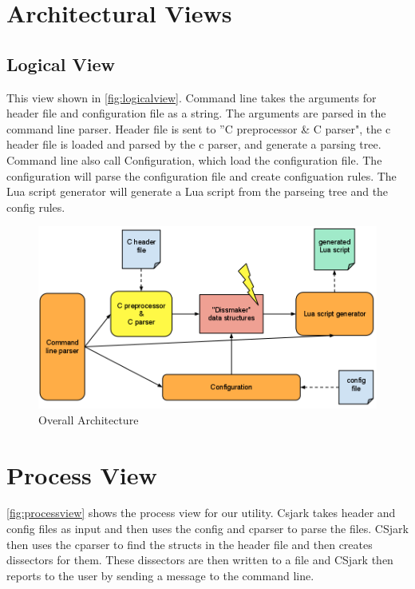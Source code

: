 \section{Architectural Views}

\subsection{Logical View}
This view shown in \autoref{fig:logicalview}. Command line takes the arguments for header file and configuration file as a string. The arguments are parsed in the command line parser. Header file is sent to ''C preprocessor \& C parser", the c header file is loaded and parsed by the c parser, and generate a parsing tree. Command line also call Configuration, which load the configuration file. The configuration will parse the configuration file and create configuation rules. The Lua script generator will generate a Lua script from the parseing tree and the config rules.

\begin{figure}[ht]
\includegraphics[width=\textwidth]{./planning/img/overall_design.png}
\caption{Overall Architecture}
\label{fig:logicalview}
\end{figure}

\section{Process View}
\autoref{fig:processview} shows the process view for our utility. Csjark takes header and config files as input and then uses the config and cparser to parse the files. CSjark then uses the cparser to find the structs in the header file and then creates dissectors for them. These dissectors are then written to a file and CSjark then reports to the user by sending a message to the command line.

